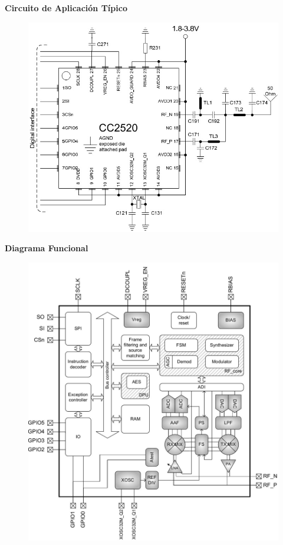 \documentclass[aspectratio=169]{beamer}
\begin{document}
\begin{frame}{\textbf{Circuito de Aplicación Típico}}
	
	\begin{figure}[H]
		\includegraphics[height=1\textheight]{./imagenes/applicationcircuit.jpg}
	\end{figure}	

\end{frame}

\begin{frame}{\textbf{Diagrama Funcional}}

	\begin{figure}[H]
		\includegraphics[height=1\textheight]{./imagenes/diagrama.jpg}
	\end{figure}	

\end{frame}
\end{document}
